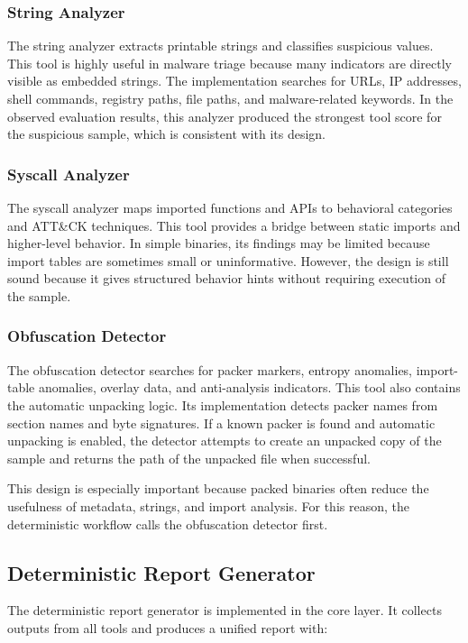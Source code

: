 \documentclass[11pt,a4paper]{article}
\begin{document}
\subsubsection{String Analyzer}
The string analyzer extracts printable strings and classifies suspicious values. This tool is highly useful in malware triage because many indicators are directly visible as embedded strings. The implementation searches for URLs, IP addresses, shell commands, registry paths, file paths, and malware-related keywords. In the observed evaluation results, this analyzer produced the strongest tool score for the suspicious sample, which is consistent with its design.

\subsubsection{Syscall Analyzer}
The syscall analyzer maps imported functions and APIs to behavioral categories and ATT\&CK techniques. This tool provides a bridge between static imports and higher-level behavior. In simple binaries, its findings may be limited because import tables are sometimes small or uninformative. However, the design is still sound because it gives structured behavior hints without requiring execution of the sample.

\subsubsection{Obfuscation Detector}
The obfuscation detector searches for packer markers, entropy anomalies, import-table anomalies, overlay data, and anti-analysis indicators. This tool also contains the automatic unpacking logic. Its implementation detects packer names from section names and byte signatures. If a known packer is found and automatic unpacking is enabled, the detector attempts to create an unpacked copy of the sample and returns the path of the unpacked file when successful.

This design is especially important because packed binaries often reduce the usefulness of metadata, strings, and import analysis. For this reason, the deterministic workflow calls the obfuscation detector first.

\subsection{Deterministic Report Generator}
The deterministic report generator is implemented in the core layer. It collects outputs from all tools and produces a unified report with:
\end{document}
